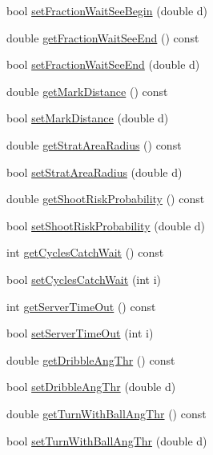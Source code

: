 \begin{DoxyCompactItemize}
\item 
bool \hyperlink{classPlayerSettings_abe5b1dba17f778d04a4df0e4b40eca00}{set\+Fraction\+Wait\+See\+Begin} (double d)
\item 
double \hyperlink{classPlayerSettings_a9c1193663c2f561c9f0202aa4d196545}{get\+Fraction\+Wait\+See\+End} () const 
\item 
bool \hyperlink{classPlayerSettings_a66755a30f30ec5c5b3805f00bd7a19af}{set\+Fraction\+Wait\+See\+End} (double d)
\item 
double \hyperlink{classPlayerSettings_a086a436c94b3bc028be7a086e54c8a3b}{get\+Mark\+Distance} () const 
\item 
bool \hyperlink{classPlayerSettings_aff59deb623936e9097ae02943b741c6a}{set\+Mark\+Distance} (double d)
\item 
double \hyperlink{classPlayerSettings_a4affb48ac93b91c53d1f34192af794bc}{get\+Strat\+Area\+Radius} () const 
\item 
bool \hyperlink{classPlayerSettings_a62ffc24e3bee58be063d18c625de1812}{set\+Strat\+Area\+Radius} (double d)
\item 
double \hyperlink{classPlayerSettings_aa6edaba41c21f4c6d61cf604f4f8168d}{get\+Shoot\+Risk\+Probability} () const 
\item 
bool \hyperlink{classPlayerSettings_afa6277adc38471faed9564c94418f6ce}{set\+Shoot\+Risk\+Probability} (double d)
\item 
int \hyperlink{classPlayerSettings_a3b730f8eca3e6cf26bfac8f31e1d28ad}{get\+Cycles\+Catch\+Wait} () const 
\item 
bool \hyperlink{classPlayerSettings_a0c2a72088a0280f2e83dee660ec063ed}{set\+Cycles\+Catch\+Wait} (int i)
\item 
int \hyperlink{classPlayerSettings_af829a56f3cde24de4212c404741eccda}{get\+Server\+Time\+Out} () const 
\item 
bool \hyperlink{classPlayerSettings_af1c207e73ba987772f742185ff3fa022}{set\+Server\+Time\+Out} (int i)
\item 
double \hyperlink{classPlayerSettings_a007673defd340921ec31f7b7f54cf65e}{get\+Dribble\+Ang\+Thr} () const 
\item 
bool \hyperlink{classPlayerSettings_a5cae40fcedeec1de188471fdd9a3d725}{set\+Dribble\+Ang\+Thr} (double d)
\item 
double \hyperlink{classPlayerSettings_ac9d8835351e0151acee1929f7391b2f9}{get\+Turn\+With\+Ball\+Ang\+Thr} () const 
\item 
bool \hyperlink{classPlayerSettings_a1a8ee5dedb30f14407a755177652580e}{set\+Turn\+With\+Ball\+Ang\+Thr} (double d)

\end{DoxyCompactItemize}
